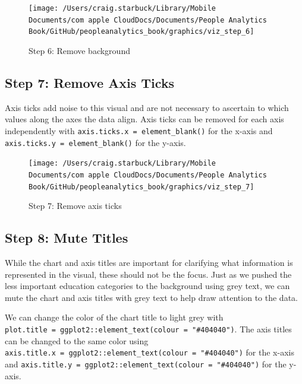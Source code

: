 \documentclass[
]{book}
\begin{document}
\begin{figure}

{\centering \texttt{[image: /Users/craig.starbuck/Library/Mobile Documents/com~apple~CloudDocs/Documents/People Analytics Book/GitHub/peopleanalytics\_book/graphics/viz\_step\_6]} 

}

\caption{Step 6: Remove background}\label{fig:barchart-6}
\end{figure}

\hypertarget{step-7-remove-axis-ticks}{%
\subsection{Step 7: Remove Axis Ticks}\label{step-7-remove-axis-ticks}}

Axis ticks add noise to this visual and are not necessary to ascertain to which values along the axes the data align. Axis ticks can be removed for each axis independently with \texttt{axis.ticks.x\ =\ element\_blank()} for the x-axis and \texttt{axis.ticks.y\ =\ element\_blank()} for the y-axis.

\begin{figure}

{\centering \texttt{[image: /Users/craig.starbuck/Library/Mobile Documents/com~apple~CloudDocs/Documents/People Analytics Book/GitHub/peopleanalytics\_book/graphics/viz\_step\_7]} 

}

\caption{Step 7: Remove axis ticks}\label{fig:barchart-7}
\end{figure}

\hypertarget{step-8-mute-titles}{%
\subsection{Step 8: Mute Titles}\label{step-8-mute-titles}}

While the chart and axis titles are important for clarifying what information is represented in the visual, these should not be the focus. Just as we pushed the less important education categories to the background using grey text, we can mute the chart and axis titles with grey text to help draw attention to the data.

We can change the color of the chart title to light grey with \texttt{plot.title\ =\ ggplot2::element\_text(colour\ =\ "\#404040")}. The axis titles can be changed to the same color using \texttt{axis.title.x\ =\ ggplot2::element\_text(colour\ =\ "\#404040")} for the x-axis and \texttt{axis.title.y\ =\ ggplot2::element\_text(colour\ =\ "\#404040")} for the y-axis.
\end{document}
